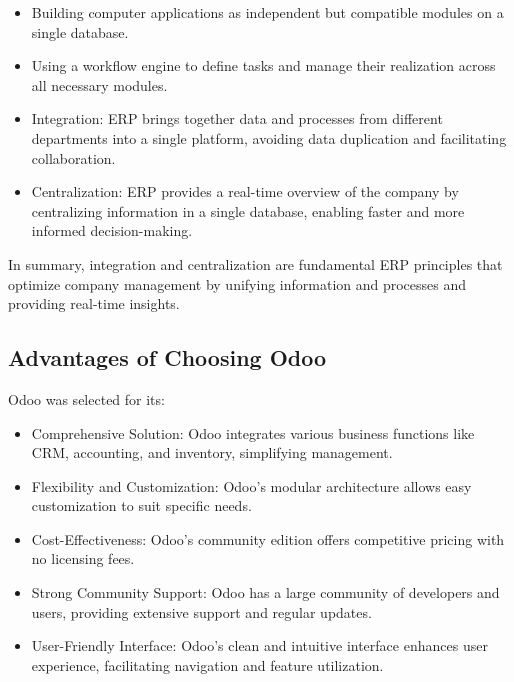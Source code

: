 \begin{itemize}

    \item Building computer applications as independent but compatible modules on a single database.
    \item Using a workflow engine to define tasks and manage their realization across all necessary modules.

    \item Integration: ERP brings together data and processes from different departments into a single platform, avoiding data duplication and facilitating collaboration.

    \item Centralization: ERP provides a real-time overview of the company by centralizing information in a single database, enabling faster and more informed decision-making.
\end{itemize}

In summary, integration and centralization are fundamental ERP principles that optimize company management by unifying information and processes and providing real-time insights.


\subsection{Advantages of Choosing Odoo}

Odoo was selected for its:

\begin{itemize}
    \item Comprehensive Solution: Odoo integrates various business functions like CRM, accounting, and inventory, simplifying management.
    
    \item Flexibility and Customization: Odoo's modular architecture allows easy customization to suit specific needs.
    
    \item Cost-Effectiveness: Odoo's community edition offers competitive pricing with no licensing fees.
    
    \item Strong Community Support: Odoo has a large community of developers and users, providing extensive support and regular updates.
    
    \item User-Friendly Interface: Odoo's clean and intuitive interface enhances user experience, facilitating navigation and feature utilization.
\end{itemize}

